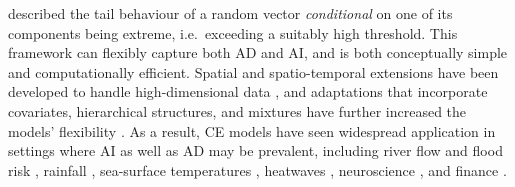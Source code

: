 \documentclass[12pt,compact]{article}
\begin{document}
\citet{Heffernan2004} described the tail behaviour of a random vector \emph{conditional} on one of its components being extreme, i.e.\ exceeding a suitably high threshold. 
This framework can flexibly capture both AD and AI, and is both conceptually simple and computationally efficient.
Spatial and spatio-temporal extensions have been developed to handle high-dimensional data \citep{Simpson2021, Wadsworth2022}, and adaptations that incorporate covariates, hierarchical structures, and mixtures have further increased the models' flexibility \citep{Richards2023, Tendijck2023, Talento2025}.
As a result, CE models have seen widespread application in settings where AI as well as AD may be prevalent, including river flow and flood risk \citep{Gilleland2013, Jane2020}, rainfall \citep{Richards2022}, sea-surface temperatures \citep{Simpson2023,Kakampakou2024}, heatwaves \citep{Winter2016}, neuroscience \citep{Guerrero2023, Talento2025}, and finance \citep{Hilal2014}. 
\end{document}
